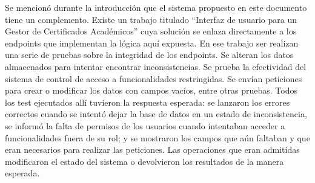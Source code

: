 Se mencionó durante la introducción que el sistema propuesto en este documento tiene un complemento. Existe un trabajo titulado ``Interfaz de usuario para un Gestor de Certificados Académicos'' cuya solución se enlaza directamente a los endpoints que implementan la lógica aquí expuesta. En ese trabajo ser realizan una serie de pruebas sobre la integridad de los endpoints. Se alteran los datos almacenados para intentar encontrar inconsistencias. Se prueba la efectividad del sistema de control de acceso a funcionalidades restringidas. Se envían peticiones para crear o modificar los datos con campos vacíos, entre otras pruebas. Todos los test ejecutados allí tuvieron la respuesta esperada: se lanzaron los errores correctos cuando se intentó dejar la base de datos en un estado de inconsistencia, se informó la falta de permisos de los usuarios cuando intentaban acceder a funcionalidades fuera de su rol; y se mostraron los campos que aún faltaban y que eran necesarios para realizar las peticiones. Las operaciones que eran admitidas modificaron el estado del sistema o devolvieron los resultados de la manera esperada.